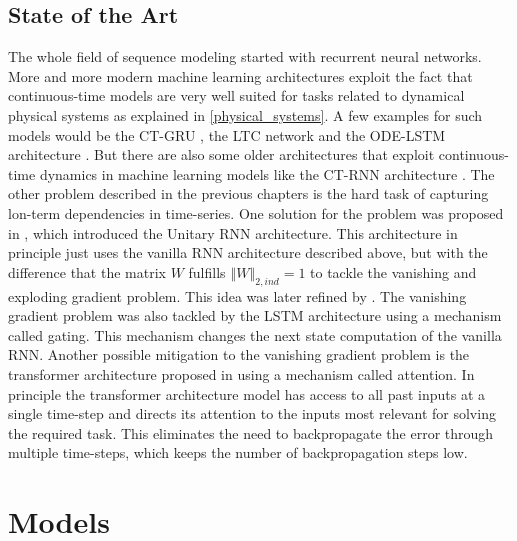 \documentclass[draft,final]{vutinfth} %
\begin{document}
    \section{State of the Art}
    The whole field of sequence modeling started with recurrent neural networks.
    More and more modern machine learning architectures exploit the fact that continuous-time models are very well suited for tasks related to dynamical physical systems as explained in \ref{physical_systems}.
    A few examples for such models would be the CT-GRU \cite{CTGRU}, the LTC network \cite{LTCNetworks} and the ODE-LSTM architecture \cite{ODELSTM}.
    But there are also some older architectures that exploit continuous-time dynamics in machine learning models like the CT-RNN architecture \cite{CTRNN}.
    The other problem described in the previous chapters is the hard task of capturing lon-term dependencies in time-series.
    One solution for the problem was proposed in \cite{UnitaryRNNs}, which introduced the Unitary RNN architecture.
    This architecture in principle just uses the vanilla RNN architecture described above, but with the difference that the matrix $W$ fulfills $\left\Vert W \right\Vert_{2,ind} = 1$ to tackle the vanishing and exploding gradient problem.
    This idea was later refined by \cite{EfficientUnitaryRNNs}.
    The vanishing gradient problem was also tackled by the LSTM architecture \cite{LSTM} using a mechanism called gating. 
    This mechanism changes the next state computation of the vanilla RNN.
    Another possible mitigation to the vanishing gradient problem is the transformer architecture proposed in \cite{Transformer} using a mechanism called attention.
    In principle the transformer architecture model has access to all past inputs at a single time-step and directs its attention to the inputs most relevant for solving the required task.
    This eliminates the need to backpropagate the error through multiple time-steps, which keeps the number of backpropagation steps low. 

    


    \chapter{Models}
\end{document}
